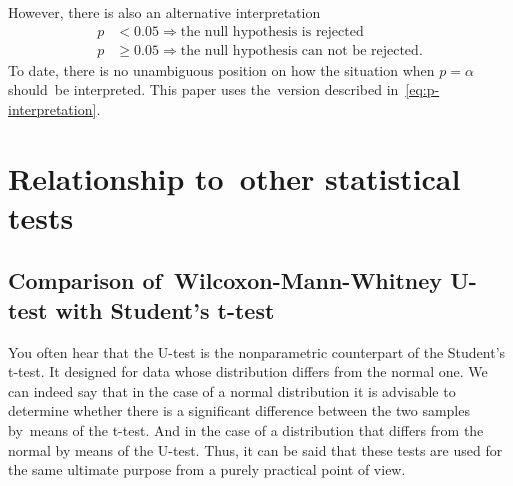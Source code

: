 \documentclass[]{scrreprt}
\begin{document}
However, there is also an alternative interpretation
\begin{equation}\label{eq:p-interpretation-2}
\begin{aligned}
p &< 0.05 \Rightarrow \text{the~null hypothesis is~rejected}\\
p &\geq 0.05 \Rightarrow \text{the~null hypothesis can~not~be rejected}.
\end{aligned}
\end{equation}
To date, there is no unambiguous position on how the situation when $p = \alpha$ should~be interpreted. This paper uses the~version described in~\ref{eq:p-interpretation}.
%
\section{Relationship to~other statistical tests}
\subsection{Comparison of~Wilcoxon-Mann-Whitney U-test with Student's t-test}
You often hear that the U-test is the nonparametric counterpart of the Student's t-test. It designed for data whose distribution differs from the normal one. We can indeed say that in the case of a normal distribution it is advisable to determine whether there is a significant difference between the two samples by~means of the t-test. And in the case of a distribution that differs from the normal by means of the U-test. Thus, it can be said that these tests are used for the same ultimate purpose from a purely practical point of view.
\end{document}
